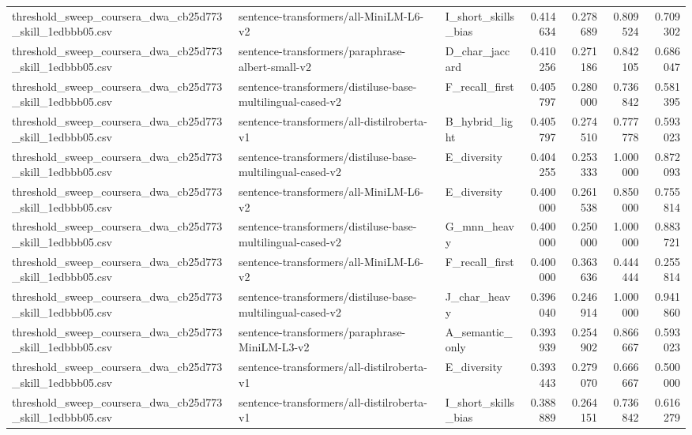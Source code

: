 \begin{table}[!ht]
\begin{tabular}{lllrrrr}
threshold\_sweep\_coursera\_dwa\_cb25d773\_skill\_1edbbb05.csv & sentence-transformers/all-MiniLM-L6-v2 & I\_short\_skills\_bias & 0.414634 & 0.278689 & 0.809524 & 0.709302 \\
threshold\_sweep\_coursera\_dwa\_cb25d773\_skill\_1edbbb05.csv & sentence-transformers/paraphrase-albert-small-v2 & D\_char\_jaccard & 0.410256 & 0.271186 & 0.842105 & 0.686047 \\
threshold\_sweep\_coursera\_dwa\_cb25d773\_skill\_1edbbb05.csv & sentence-transformers/distiluse-base-multilingual-cased-v2 & F\_recall\_first & 0.405797 & 0.280000 & 0.736842 & 0.581395 \\
threshold\_sweep\_coursera\_dwa\_cb25d773\_skill\_1edbbb05.csv & sentence-transformers/all-distilroberta-v1 & B\_hybrid\_light & 0.405797 & 0.274510 & 0.777778 & 0.593023 \\
threshold\_sweep\_coursera\_dwa\_cb25d773\_skill\_1edbbb05.csv & sentence-transformers/distiluse-base-multilingual-cased-v2 & E\_diversity & 0.404255 & 0.253333 & 1.000000 & 0.872093 \\
threshold\_sweep\_coursera\_dwa\_cb25d773\_skill\_1edbbb05.csv & sentence-transformers/all-MiniLM-L6-v2 & E\_diversity & 0.400000 & 0.261538 & 0.850000 & 0.755814 \\
threshold\_sweep\_coursera\_dwa\_cb25d773\_skill\_1edbbb05.csv & sentence-transformers/distiluse-base-multilingual-cased-v2 & G\_mnn\_heavy & 0.400000 & 0.250000 & 1.000000 & 0.883721 \\
threshold\_sweep\_coursera\_dwa\_cb25d773\_skill\_1edbbb05.csv & sentence-transformers/all-MiniLM-L6-v2 & F\_recall\_first & 0.400000 & 0.363636 & 0.444444 & 0.255814 \\
threshold\_sweep\_coursera\_dwa\_cb25d773\_skill\_1edbbb05.csv & sentence-transformers/distiluse-base-multilingual-cased-v2 & J\_char\_heavy & 0.396040 & 0.246914 & 1.000000 & 0.941860 \\
threshold\_sweep\_coursera\_dwa\_cb25d773\_skill\_1edbbb05.csv & sentence-transformers/paraphrase-MiniLM-L3-v2 & A\_semantic\_only & 0.393939 & 0.254902 & 0.866667 & 0.593023 \\
threshold\_sweep\_coursera\_dwa\_cb25d773\_skill\_1edbbb05.csv & sentence-transformers/all-distilroberta-v1 & E\_diversity & 0.393443 & 0.279070 & 0.666667 & 0.500000 \\
threshold\_sweep\_coursera\_dwa\_cb25d773\_skill\_1edbbb05.csv & sentence-transformers/all-distilroberta-v1 & I\_short\_skills\_bias & 0.388889 & 0.264151 & 0.736842 & 0.616279 \\

\end{tabular}
\end{table}
